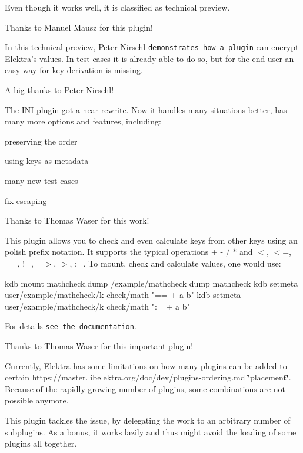 Even though it works well, it is classified as technical preview.

Thanks to Manuel Mausz for this plugin!

In this technical preview, Peter Nirschl \href{https://master.libelektra.org/src/plugins/crypto/}{\tt demonstrates how a plugin} can encrypt Elektra’s values. In test cases it is already able to do so, but for the end user an easy way for key derivation is missing.

A big thanks to Peter Nirschl!

The I\+NI plugin got a near rewrite. Now it handles many situations better, has many more options and features, including\+:


\begin{DoxyItemize}
\item preserving the order
\item using keys as metadata
\item many new test cases
\item fix escaping
\end{DoxyItemize}

Thanks to Thomas Waser for this work!

This plugin allows you to check and even calculate keys from other keys using an polish prefix notation. It supports the typical operations {\ttfamily + -\/ / $\ast$} and {\ttfamily $<$, $<$=, ==, !=, =$>$, $>$, \+:=}. To mount, check and calculate values, one would use\+:


\begin{DoxyCode}
kdb mount mathcheck.dump /example/mathcheck dump mathcheck
kdb setmeta user/example/mathcheck/k check/math "== + a b"
kdb setmeta user/example/mathcheck/k check/math ":= + a b"
\end{DoxyCode}


For details \href{https://master.libelektra.org/src/plugins/mathcheck/}{\tt see the documentation}.

Thanks to Thomas Waser for this important plugin!

Currently, Elektra has some limitations on how many plugins can be added to certain https\+://master.libelektra.\+org/doc/dev/plugins-\/ordering.md \char`\"{}placement\char`\"{}. Because of the rapidly growing number of plugins, some combinations are not possible anymore.

This plugin tackles the issue, by delegating the work to an arbitrary number of subplugins. As a bonus, it works lazily and thus might avoid the loading of some plugins all together.

